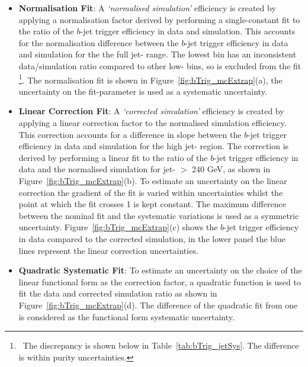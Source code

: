 \begin{itemize}[leftmargin=*]  
  \setlength\itemsep{0.5em}
\item \textbf{Normalisation Fit}: A \textit{`normalised simulation'} efficiency is created by applying
  a normalisation factor derived by performing a single-constant fit
  to the ratio of the $b$-jet trigger efficiency in data and simulation.
  This accounts for the normalisation difference between the $b$-jet trigger efficiency in data and simulation for the the full jet-\pT{} range.
  The lowest \pT{} bin has an inconsistent data/simulation ratio compared to other low-\pT{} bins, so is excluded from the fit
  \footnote{\ The discrepancy is shown below in Table~\ref{tab:bTrig_jetSys}. The difference is within purity uncertainties.}.
  The normalisation fit is shown in Figure~\ref{fig:bTrig_mcExtrap}(a),
  the uncertainty on the fit-parameter is used as a systematic uncertainty.
  
\item \textbf{Linear Correction Fit}:
  A \textit{`corrected simulation'} efficiency is created by applying a linear correction factor to the normalised simulation efficiency.
  This correction accounts for a difference in slope between the $b$-jet trigger efficiency in data and simulation for the high jet-\pT{} region.
  The correction is derived by performing a linear fit to the ratio of the $b$-jet trigger efficiency in data and the normalised simulation
  for jet-\pT{} $>$ 240 GeV, as shown in Figure~\ref{fig:bTrig_mcExtrap}(b).
  To estimate an uncertainty on the linear correction the gradient of the fit is varied within uncertainties
  whilst the point at which the fit crosses 1 is kept constant.
  The maximum difference between the nominal fit and the systematic variations is used as a symmetric uncertainty.
  Figure~\ref{fig:bTrig_mcExtrap}(c) shows the $b$-jet trigger efficiency in data compared to the corrected simulation,
  in the lower panel the blue lines represent the linear correction uncertainties.
  
\item \textbf{Quadratic Systematic Fit}: 
  To estimate an uncertainty on the choice of the linear functional form as the correction factor,
  a quadratic function is used to fit the data and corrected simulation ratio
  as shown in Figure~\ref{fig:bTrig_mcExtrap}(d).
  The difference of the quadratic fit from one is considered as the functional form systematic uncertainty.
\end{itemize}

